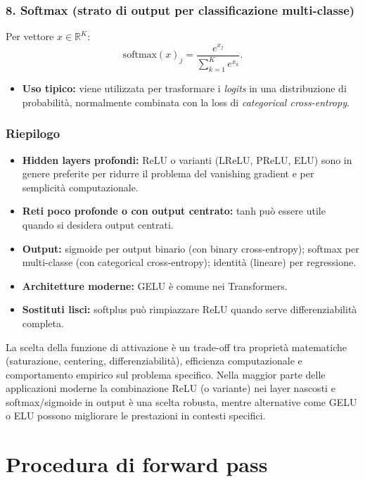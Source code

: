 \documentclass[a4paper,12pt]{report}
\begin{document}
	\subsubsection{8. Softmax (strato di output per classificazione multi-classe)}
	Per vettore $x\in\mathbb{R}^K$:
	\[
	\mathrm{softmax}(x)_j=\frac{e^{x_j}}{\sum_{k=1}^K e^{x_k}}.
	\]
	\begin{itemize}
		\item \textbf{Uso tipico:} viene utilizzata per trasformare i \emph{logits} in una distribuzione di probabilità, normalmente combinata con la loss di \emph{categorical cross-entropy}.
	\end{itemize}
	
	\subsubsection{Riepilogo}
	\begin{itemize}
		\item \textbf{Hidden layers profondi:} ReLU o varianti (LReLU, PReLU, ELU) sono in genere preferite per ridurre il problema del vanishing gradient e per semplicità computazionale.
		\item \textbf{Reti poco profonde o con output centrato:} tanh può essere utile quando si desidera output centrati.
		\item \textbf{Output:} sigmoide per output binario (con binary cross-entropy); softmax per multi-classe (con categorical cross-entropy); identità (lineare) per regressione.
		\item \textbf{Architetture moderne:} GELU è comune nei Transformers.
		\item \textbf{Sostituti lisci:} softplus può rimpiazzare ReLU quando serve differenziabilità completa.
	\end{itemize}
	La scelta della funzione di attivazione è un trade-off tra proprietà matematiche (saturazione, centering, differenziabilità), efficienza computazionale e comportamento empirico sul problema specifico. Nella maggior parte delle applicazioni moderne la combinazione ReLU (o variante) nei layer nascosti e softmax/sigmoide in output è una scelta robusta, mentre alternative come GELU o ELU possono migliorare le prestazioni in contesti specifici.
	
	\section{Procedura di forward pass}
	
\end{document}
